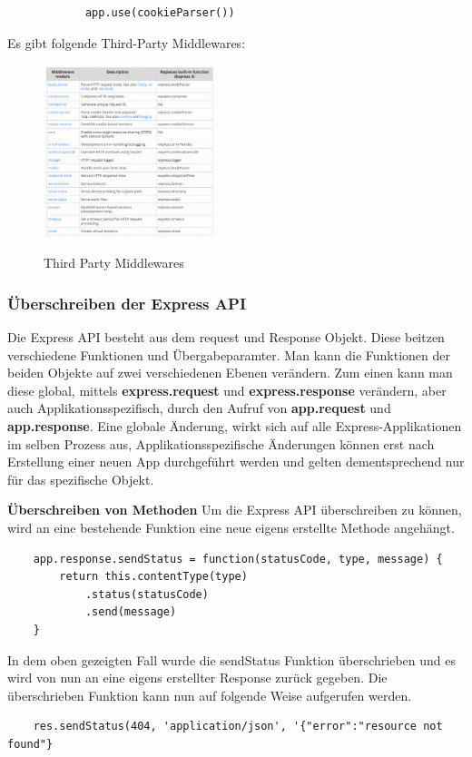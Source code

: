 \begin{itemize}
\begin{lstlisting}
            app.use(cookieParser())
        \end{lstlisting}
        Es gibt folgende Third-Party Middlewares:\newline
        \begin{figure}[h!]
            \centering
            \includegraphics[width=0.45\textwidth]{pics/Third-Party-Middleware.png}
            \caption{Third Party Middlewares}
            \cite{Express_js_third_party_middlewares}
            \label{fig:enter-label}
        \end{figure}
\end{itemize}
\cite{Express_js_writing_middleware}
\cite{Express_js_using_middleware}
\cite{Express_js_middleware_help_1}

\subsubsection{Überschreiben der Express API}
Die Express API besteht aus dem request und Response Objekt. Diese beitzen verschiedene Funktionen und Übergabeparamter. Man kann die Funktionen der beiden Objekte auf zwei verschiedenen Ebenen verändern. Zum einen kann man diese global, mittels \textbf{express.request} und \textbf{express.response} verändern, aber auch Applikationsspezifisch, durch den Aufruf von \textbf{app.request} und \textbf{app.response}. Eine globale Änderung, wirkt sich auf alle Express-Applikationen im selben Prozess aus, Applikationsspezifische Änderungen können erst nach Erstellung einer neuen App durchgeführt werden und gelten dementsprechend nur für das spezifische Objekt. 

\textbf{Überschreiben von Methoden}
\newline
Um die Express API überschreiben zu können, wird an eine bestehende Funktion eine neue eigens erstellte Methode angehängt.
\begin{lstlisting}
    app.response.sendStatus = function(statusCode, type, message) {
        return this.contentType(type)
            .status(statusCode)
            .send(message)
    }
\end{lstlisting}
In dem oben gezeigten Fall wurde die sendStatus Funktion überschrieben und es wird von nun an eine eigens erstellter Response zurück gegeben. Die überschrieben Funktion kann nun auf folgende Weise aufgerufen werden.
\begin{lstlisting}
    res.sendStatus(404, 'application/json', '{"error":"resource not found"}            
\end{lstlisting}

